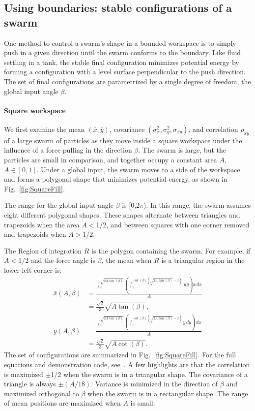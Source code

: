 \subsection{Using boundaries: stable configurations of a swarm}\label{subsec:FluidInTank}
One method to control a swarm's shape in a bounded workspace is to simply push in a given direction until the swarm conforms to the boundary. Like fluid settling in a tank, the stable final configuration minimizes potential energy by forming a configuration with a level surface perpendicular to the push direction. The set of final configurations are parametrized by a single degree of freedom, the global input angle $\beta$.
\paragraph{Square workspace}
We first examine the mean $(\bar{x},\bar{y})$, covariance $(\sigma^2_x,\sigma^2_y,\sigma_{xy})$, and correlation $\rho_{xy}$ of a large swarm of particles as they move inside a square workspace under the influence of a force pulling in the direction $\beta$. The swarm is large, but the particles are small in comparison, and together occupy a constant area $A$, $A\in [0,1]$. Under a global input, the swarm moves to a side of the workspace and forms a polygonal shape that minimizes potential energy, as shown in Fig.~\ref{fig:SquareFill}. %

The range for the global input angle $\beta $ is [0,2$\pi $). In this range, the swarm assumes eight different polygonal shapes. 
These shapes alternate between triangles and trapezoids when the area $A$$<$1/2, and between squares with one corner removed and trapezoids when $A$$>$1/2.


The Region of integration $R$ is the polygon containing the swarm. For example, if $A<1/2$ and the force angle is $\beta$, the mean when $R$ is a triangular region in the lower-left corner is:
\begin{align}\label{eq:meanInSquareWorkspaceLL}
\bar{x}(A,\beta) &= \frac{\int_0^{\sqrt{2 A \tan (\beta)}} \left(\int_0^{\cot (\beta) \left(\sqrt{2 A \tan (\beta)}-x\right)} \, dy\right) x \, dx}{A} \nonumber \\
	&=\frac{ \sqrt{2}}{3} \sqrt{A \tan (\beta )},\\
\bar{y}(A,\beta) &= \frac{\int_0^{\sqrt{2 A \tan (\beta)}} \left(\int_0^{\cot (\beta) \left(\sqrt{2 A \tan (\beta)}-x\right)} y \, dy\right) \, dx}{A} \nonumber\\
	&=\frac{\sqrt{2}}{3}  \sqrt{A \cot (\beta )}.
\end{align}
The set of configurations are summarized in Fig.~\ref{fig:SquareFill}. For the full equations and demonstration code, see~\cite{Haoran2016SwarminSquare}. A few highlights are that the correlation is maximized $\pm$1/2 when the swarm is in a triangular shape. The covariance of a triangle is always $\pm(A/18)$. Variance is minimized in the direction of $\beta$ and maximized orthogonal to $\beta$ when the swarm is in a rectangular shape. The range of mean positions are maximized when $A$ is small.

